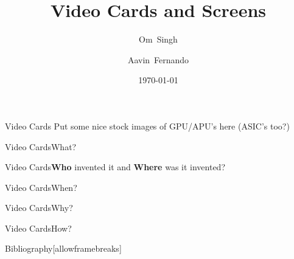 \documentclass{beamer}
\title{Video Cards and Screens}
\author{Om~Singh \and Aavin~Fernando}
\institute{NBHS}
\date{\today}
\begin{document}
\begin{frame}
  \titlepage
\end{frame}

\begin{frame}{Video Cards}
	Put some nice stock images of GPU/APU's here (ASIC's too?)
\end{frame}

\begin{frame}{Video Cards}{What?}
\end{frame}

\begin{frame}{Video Cards}{{\bf Who} invented it and {\bf Where} was it invented?}
\end{frame}

\begin{frame}{Video Cards}{When?}
\end{frame}

\begin{frame}{Video Cards}{Why?}
\end{frame}

\begin{frame}{Video Cards}{How?}
\end{frame}

\begin{frame}{Bibliography}[allowframebreaks]
    \nocite{*}
    
    
\end{frame}
\end{document}
